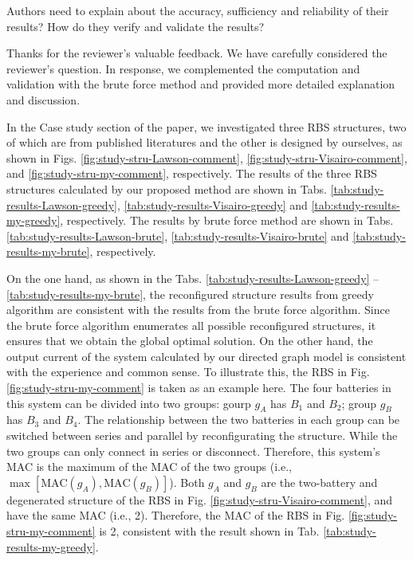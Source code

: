 \begin{revcomment}
  Authors need to explain about the accuracy, sufficiency and reliability of their results? How do they verify and validate the results?
\end{revcomment}
\begin{revresponse}

Thanks for the reviewer's valuable feedback. 
We have carefully considered the reviewer's question.
In response, we complemented the computation and validation with the brute force method and provided more detailed explanation and discussion.


In the Case study section of the paper, we investigated three RBS structures, two of which are from published literatures \cite{lawsonSoftwareConfigurableBattery2012,visairoReconfigurableBatteryPack2008} and the other is designed by ourselves, as shown in Figs. \ref{fig:study-stru-Lawson-comment}, \ref{fig:study-stru-Visairo-comment}, and \ref{fig:study-stru-my-comment}, respectively.
The results of the three RBS structures calculated by our proposed method are shown in Tabs. \ref{tab:study-results-Lawson-greedy}, \ref{tab:study-results-Visairo-greedy} and \ref{tab:study-results-my-greedy}, respectively.
The results by brute force method are shown in Tabs. \ref{tab:study-results-Lawson-brute}, \ref{tab:study-results-Visairo-brute} and \ref{tab:study-results-my-brute}, respectively.


On the one hand, as shown in the Tabs. \ref{tab:study-results-Lawson-greedy} -- \ref{tab:study-results-my-brute}, the reconfigured structure results from greedy algorithm are consistent with the results from the brute force algorithm.
Since the brute force algorithm enumerates all possible reconfigured structures, it ensures that we obtain the global optimal solution.
On the other hand, the output current of the system calculated by our directed graph model is consistent with the experience and common sense.
To illustrate this, the RBS in Fig. \ref{fig:study-stru-my-comment} is taken as an example here.
The four batteries in this system can be divided into two groups: gourp $g_A$ has $B_1$ and $B_2$; group $g_B$ has $B_3$ and $B_4$.
The relationship between the two batteries in each group can be switched between series and parallel by reconfigurating the structure.
While the two groups can only connect in series or disconnect.
Therefore, this system's MAC is the maximum of the MAC of the two groups (i.e., $\max[\text{MAC}(g_A),\text{MAC}(g_B)]$).
Both $g_A$ and $g_B$ are the two-battery and degenerated structure of the RBS in Fig. \ref{fig:study-stru-Visairo-comment}, and have the same MAC (i.e., 2).
Therefore, the MAC of the RBS in Fig. \ref{fig:study-stru-my-comment} is 2, consistent with the result shown in Tab. \ref{tab:study-results-my-greedy}.



\end{revresponse}
